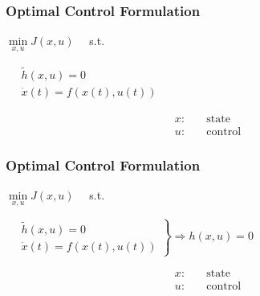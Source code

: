 \begin{frame}
	\frametitle{Optimal Control Formulation}
	\begin{block}{}
		\begin{center}
		 \parbox{9.5cm}{\( \min \limits_{x,u} J(x,u) \quad  \) s.t. \parbox{\textwidth}{
				\( \quad \left. \begin{array}{c} \tilde{h}(x,u)=0 \\  \dot{x}(t) = f(x(t),u(t)) \end{array} \right.\)	}}
				\begin{align*}
					x: & \quad \text{state} \\
					u: & \quad \text{control}
				\end{align*}
		\end{center}
	\end{block}
\end{frame}

\begin{frame}
	\frametitle{Optimal Control Formulation}
	\begin{block}{}
		\begin{center}
		 \parbox{9.5cm}{\( \min \limits_{x,u} J(x,u) \quad  \) s.t. \parbox{\textwidth}{
				\( \quad \left. \begin{array}{c} \tilde{h}(x,u)=0 \\  \dot{x}(t) = f(x(t),u(t)) \end{array} \right\} \Rightarrow h(x,u) = 0 \)	}}
				\begin{align*}
					x: & \quad \text{state} \\
					u: & \quad \text{control}
				\end{align*}
		\end{center}
	\end{block}
\end{frame}

